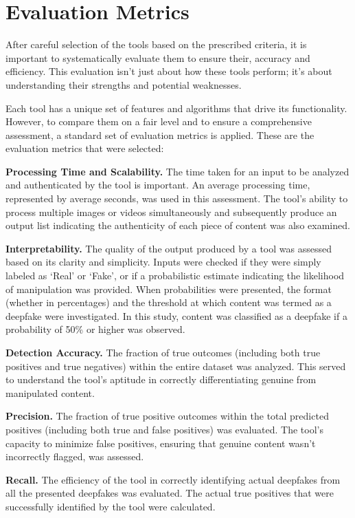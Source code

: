 \section{Evaluation Metrics}
After careful selection of the tools based on the prescribed criteria, it is
important to systematically evaluate them to ensure their, accuracy
and efficiency. This evaluation isn't just about how these tools perform; it's
about understanding their strengths and potential weaknesses.

Each tool has a unique set of features and algorithms that drive its functionality.
However, to compare them on a fair level and to ensure a comprehensive
assessment, a standard set of evaluation metrics is applied. These are the evaluation
metrics that were selected:

\textbf{Processing Time and Scalability.} The time taken for an input to be analyzed
and authenticated by the tool is important. An average processing time, represented
by average seconds, was used in this assessment. The tool's ability to process multiple
images or videos simultaneously and subsequently produce an output list indicating
the authenticity of each piece of content was also examined.

\textbf{Interpretability.} The quality of the output produced by a tool was assessed
based on its clarity and simplicity. Inputs were checked if they were simply labeled
as `Real' or `Fake', or if a probabilistic estimate indicating the likelihood of
manipulation was provided. When probabilities were presented, the format
(whether in percentages) and the threshold at which content was termed as a deepfake
were investigated. In this study, content was classified as a deepfake if a
probability of 50\% or higher was observed.

\textbf{Detection Accuracy.} The fraction of true outcomes (including both true
positives and true negatives) within the entire dataset was analyzed. This served
to understand the tool's aptitude in correctly differentiating genuine from manipulated
content.

\textbf{Precision.} The fraction of true positive outcomes within the total predicted
positives (including both true and false positives) was evaluated. The tool's capacity
to minimize false positives, ensuring that genuine content wasn't incorrectly flagged,
was assessed.

\textbf{Recall.} The efficiency of the tool in correctly identifying actual deepfakes
from all the presented deepfakes was evaluated. The actual true positives that were
successfully identified by the tool were calculated.

